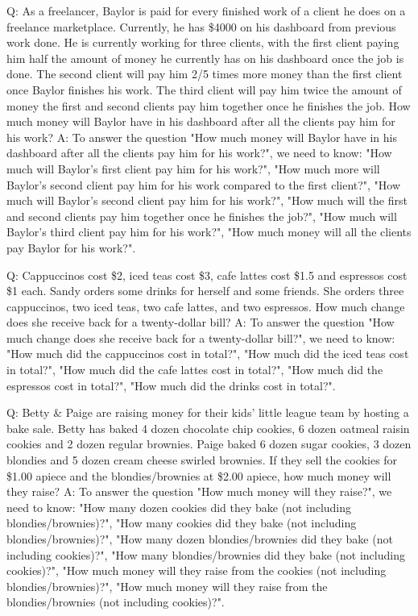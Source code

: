 \documentclass[11pt]{article}
\begin{document}
Q: As a freelancer, Baylor is paid for every finished work of a client he does on a freelance
marketplace. Currently, he has \$4000 on his dashboard from previous work done. He is currently
working for three clients, with the first client paying him half the amount of money he currently
has on his dashboard once the job is done. The second client will pay him 2/5 times more money
than the first client once Baylor finishes his work. The third client will pay him twice the amount of
money the first and second clients pay him together once he finishes the job. How much money will
Baylor have in his dashboard after all the clients pay him for his work?
A: To answer the question "How much money will Baylor have in his dashboard after all the clients
pay him for his work?", we need to know: "How much will Baylor's first client pay him for his
work?", "How much more will Baylor's second client pay him for his work compared to the first
client?", "How much will Baylor's second client pay him for his work?", "How much will the
first and second clients pay him together once he finishes the job?", "How much will Baylor's
third client pay him for his work?", "How much money will all the clients pay Baylor for his work?".

Q: Cappuccinos cost \$2, iced teas cost \$3, cafe lattes cost \$1.5 and espressos cost \$1 each.
Sandy orders some drinks for herself and some friends. She orders three cappuccinos, two iced teas,
two cafe lattes, and two espressos. How much change does she receive back for a twenty-dollar
bill?
A: To answer the question "How much change does she receive back for a twenty-dollar bill?", we
need to know: "How much did the cappuccinos cost in total?", "How much did the iced teas cost in
total?", "How much did the cafe lattes cost in total?", "How much did the espressos cost in total?",
"How much did the drinks cost in total?".

Q: Betty \& Paige are raising money for their kids' little league team by hosting a bake sale.
Betty has baked 4 dozen chocolate chip cookies, 6 dozen oatmeal raisin cookies and 2 dozen regular
brownies. Paige baked 6 dozen sugar cookies, 3 dozen blondies and 5 dozen cream cheese swirled
brownies. If they sell the cookies for \$1.00 apiece and the blondies/brownies at \$2.00 apiece, how
much money will they raise?
A: To answer the question "How much money will they raise?", we need to know: "How many
dozen cookies did they bake (not including blondies/brownies)?", "How many cookies did they
bake (not including blondies/brownies)?", "How many dozen blondies/brownies did they bake
(not including cookies)?", "How many blondies/brownies did they bake (not including cookies)?",
"How much money will they raise from the cookies (not including blondies/brownies)?", "How
much money will they raise from the blondies/brownies (not including cookies)?".
\end{document}
